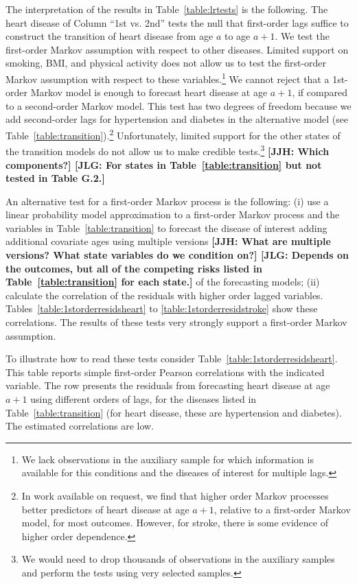 \noindent The interpretation of the results in Table~\ref{table:lrtests} is the following. The heart disease of Column ``1st vs. 2nd'' tests the null that first-order lags suffice to construct the transition of heart disease from age $a$ to age $a+1$. We test the first-order Markov assumption with respect to other diseases. Limited support on smoking, BMI, and physical activity does not allow us to test the first-order Markov assumption with respect to these variables.\footnote{We lack observations in the auxiliary sample for which information is available for this conditions and the diseases of interest for multiple lags.} We cannot reject that a 1st-order Markov model is enough to forecast heart disease at age $a+1$, if compared to a second-order Markov model. This test has two degrees of freedom because we add second-order lags for hypertension and diabetes in the alternative model (see Table~\ref{table:transition}).\footnote{In work available on request, we find that higher order Markov processes better predictors of heart disease at age $a+1$, relative to a first-order Markov model, for most outcomes. However, for stroke, there is some evidence of higher order dependence.} Unfortunately, limited support for the other states of the transition models do not allow us to make credible tests.\footnote{We would need to drop thousands of observations in the auxiliary samples and perform the tests using very selected samples.} \textbf{[JJH: Which components?] [JLG: For states in Table~\ref{table:transition} but not tested in Table G.2.]}

\noindent An alternative test for a first-order Markov process is the following: (i) use a linear probability model approximation to a first-order Markov process and the variables in Table~\ref{table:transition} to forecast the disease of interest adding additional covariate ages using multiple versions \textbf{[JJH: What are multiple versions? What state variables do we condition on?] [JLG: Depends on the outcomes, but all of the competing risks listed in Table~\ref{table:transition} for each state.]} of the forecasting models; (ii) calculate the correlation of the residuals with higher order lagged variables. Tables~\ref{table:1storderresidsheart} to \ref{table:1storderresidstroke} show these correlations. The results of these tests very strongly support a first-order Markov assumption.

\noindent To illustrate how to read these tests consider Table~\ref{table:1storderresidsheart}. This table reports simple first-order Pearson correlations with the indicated variable. The row presents the residuals from forecasting heart disease at age $a+1$ using different orders of lags, for the diseases listed in Table~\ref{table:transition} (for heart disease, these are hypertension and diabetes). The estimated correlations are low.

